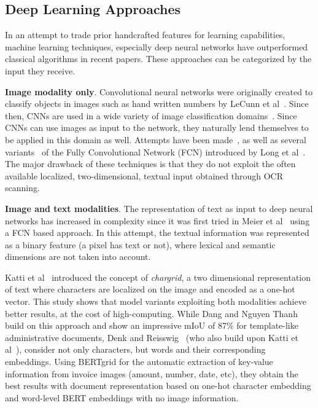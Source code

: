 \documentclass[oneside, english, bibtex]{kththesis}
\begin{document}
\subsection{Deep Learning Approaches}
\label{subs:dlapproaches}

In an attempt to trade prior handcrafted features for learning capabilities, machine learning techniques, especially deep neural networks have outperformed classical algorithms in recent papers. These approaches can be categorized by the input they receive.

\textbf{Image modality only}. Convolutional neural networks were originally created to classify objects in images such as hand written numbers by LeCunn et al~\cite{lecun1989}. Since then, CNNs are used in a wide variety of image classification domains~\cite{deng2009}. Since CNNs can use images as input to the network, they naturally lend themselves to be applied in this domain as well. Attempts have been made~\cite{DBLP:journals/corr/0011S17}, as well as several variants~\cite{he2017, xu2017, wickpuppe2018, oliveira2018} of the Fully Convolutional Network (FCN) introduced by Long et al~\cite{DBLP:journals/corr/LongSD14}. The major drawback of these techniques is that they do not exploit the often available localized, two-dimensional, textual input obtained through OCR scanning.

\textbf{Image and text modalities}. The representation of text as input to deep neural networks has increased in complexity since it was first tried in Meier et al~\cite{8270006} using a FCN based approach. In this attempt, the textual information was represented as a binary feature (a pixel has text or not), where lexical and semantic dimensions are not taken into account.

Katti et al~\cite{katti2018} introduced the concept of \textit{chargrid}, a two dimensional representation of text where characters are localized on the image and encoded as a one-hot vector. This study shows that model variants exploiting both modalities achieve better results, at the cost of high-computing. While Dang and Nguyen Thanh~\cite{DBLP:journals/corr/abs-2106-00952} build on this approach and show an impressive mIoU of 87\% for template-like administrative documents, Denk and Reisswig~\cite{DBLP:journals/corr/abs-1909-04948} (who also build upon Katti et al~\cite{katti2018}), consider not only characters, but words and their corresponding embeddings. Using BERTgrid for the automatic extraction of key-value information from invoice images (amount, number, date, etc), they obtain the best results with document representation based on one-hot character embedding and word-level BERT embeddings with no image information.
\end{document}
